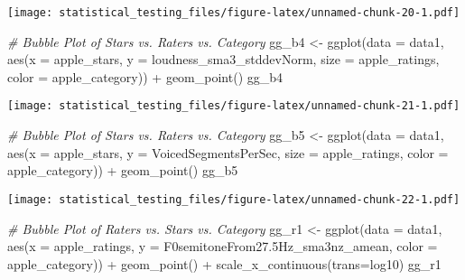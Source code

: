 \documentclass[
]{article}
\newenvironment{Shaded}{\begin{snugshade}}{\end{snugshade}}
\newcommand{\AttributeTok}[1]{\textcolor[rgb]{0.77,0.63,0.00}{#1}}
\newcommand{\CommentTok}[1]{\textcolor[rgb]{0.56,0.35,0.01}{\textit{#1}}}
\newcommand{\FloatTok}[1]{\textcolor[rgb]{0.00,0.00,0.81}{#1}}
\newcommand{\FunctionTok}[1]{\textcolor[rgb]{0.00,0.00,0.00}{#1}}
\newcommand{\NormalTok}[1]{#1}
\newcommand{\OtherTok}[1]{\textcolor[rgb]{0.56,0.35,0.01}{#1}}
\newcommand{\SpecialCharTok}[1]{\textcolor[rgb]{0.00,0.00,0.00}{#1}}
\newcommand{\StringTok}[1]{\textcolor[rgb]{0.31,0.60,0.02}{#1}}
\begin{document}
\texttt{[image: statistical\_testing\_files/figure-latex/unnamed-chunk-20-1.pdf]}

\begin{Shaded}
\begin{Highlighting}[]
\CommentTok{\# Bubble Plot of Stars vs. Raters vs. Category}
\NormalTok{gg\_b4 }\OtherTok{\textless{}{-}} \FunctionTok{ggplot}\NormalTok{(}\AttributeTok{data =}\NormalTok{ data1, }\FunctionTok{aes}\NormalTok{(}\AttributeTok{x =}\NormalTok{ apple\_stars, }\AttributeTok{y =}\NormalTok{ loudness\_sma3\_stddevNorm, }\AttributeTok{size =}\NormalTok{ apple\_ratings, }\AttributeTok{color =}\NormalTok{ apple\_category)) }\SpecialCharTok{+}
  \FunctionTok{geom\_point}\NormalTok{()}
\NormalTok{gg\_b4}
\end{Highlighting}
\end{Shaded}

\texttt{[image: statistical\_testing\_files/figure-latex/unnamed-chunk-21-1.pdf]}

\begin{Shaded}
\begin{Highlighting}[]
\CommentTok{\# Bubble Plot of Stars vs. Raters vs. Category}
\NormalTok{gg\_b5 }\OtherTok{\textless{}{-}} \FunctionTok{ggplot}\NormalTok{(}\AttributeTok{data =}\NormalTok{ data1, }\FunctionTok{aes}\NormalTok{(}\AttributeTok{x =}\NormalTok{ apple\_stars, }\AttributeTok{y =}\NormalTok{ VoicedSegmentsPerSec, }\AttributeTok{size =}\NormalTok{ apple\_ratings, }\AttributeTok{color =}\NormalTok{ apple\_category)) }\SpecialCharTok{+}
  \FunctionTok{geom\_point}\NormalTok{()}
\NormalTok{gg\_b5}
\end{Highlighting}
\end{Shaded}

\texttt{[image: statistical\_testing\_files/figure-latex/unnamed-chunk-22-1.pdf]}

\begin{Shaded}
\begin{Highlighting}[]
\CommentTok{\# Bubble Plot of Raters vs. Stars vs. Category}
\NormalTok{gg\_r1 }\OtherTok{\textless{}{-}} \FunctionTok{ggplot}\NormalTok{(}\AttributeTok{data =}\NormalTok{ data1, }\FunctionTok{aes}\NormalTok{(}\AttributeTok{x =}\NormalTok{ apple\_ratings, }\AttributeTok{y =}\NormalTok{ F0semitoneFrom27}\FloatTok{.5}\NormalTok{Hz\_sma3nz\_amean, }\AttributeTok{color =}\NormalTok{ apple\_category)) }\SpecialCharTok{+}
  \FunctionTok{geom\_point}\NormalTok{() }\SpecialCharTok{+}
    \FunctionTok{scale\_x\_continuous}\NormalTok{(}\AttributeTok{trans=}\StringTok{\textquotesingle{}log10\textquotesingle{}}\NormalTok{)}
\NormalTok{gg\_r1}
\end{Highlighting}
\end{Shaded}
\end{document}
